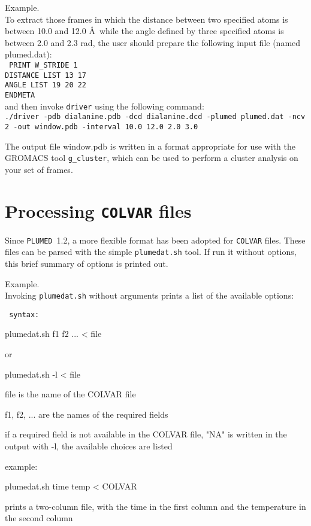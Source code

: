 \documentclass[12pt,fleqn]{report}
\newcommand{\plumed}{{\tt PLUMED}}
\newcommand{\esempio}[1]{
\vspace{10pt}
\begin{flushright}
\colorbox{light-gray}{
   \begin{minipage}{13cm}
       \scriptsize{
{\fontfamily{phv} \fontseries{b}
 \selectfont Example. \\
 \fontseries{m} \selectfont #1 } }
\end{minipage}}
\end{flushright}
\vspace{20pt}
}
\begin{document}
\esempio{To extract those frames in which the distance between 
two specified atoms is between 10.0 and 12.0 \AA  \ while the angle defined by three specified atoms is between 2.0 and 2.3 rad, 
the user should prepare the following input file (named plumed.dat):  \vspace{10pt} \\ 
{\tt
PRINT W\_STRIDE 1 \\
DISTANCE LIST 13 17\\
ANGLE LIST 19 20 22\\
ENDMETA \vspace{10pt}\\
}
and then invoke {\tt driver} using the following command:  \vspace{10pt} \\
{\tt  ./driver -pdb dialanine.pdb -dcd dialanine.dcd \/
  -plumed plumed.dat -ncv 2 -out window.pdb -interval 10.0 12.0 2.0 3.0 \\ }

The output file window.pdb is written in a format appropriate for use with the GROMACS tool {\tt g\_cluster}, which can be used to perform
a cluster analysis on your set of frames.

}

\section{Processing {\tt COLVAR} files}


Since \plumed\ 1.2, a more flexible format has been adopted for {\tt COLVAR} files.
These files can be parsed with the simple {\tt plumedat.sh} tool.
If run it without options, this brief summary of options is printed out.

\esempio{Invoking {\tt plumedat.sh} without arguments prints a list of the available options: \vspace{10pt} \\
{\tt
syntax:

plumedat.sh f1 f2 ... < file

or

plumedat.sh -l < file

file is the name of the COLVAR file

f1, f2, ... are the names of the required fields

if a required field is not available in the COLVAR file, "NA" is written in the output
with -l, the available choices are listed

example:

plumedat.sh time temp < COLVAR

prints a two-column file, with the time in the first column and the temperature
in the second column
}
}
\end{document}
